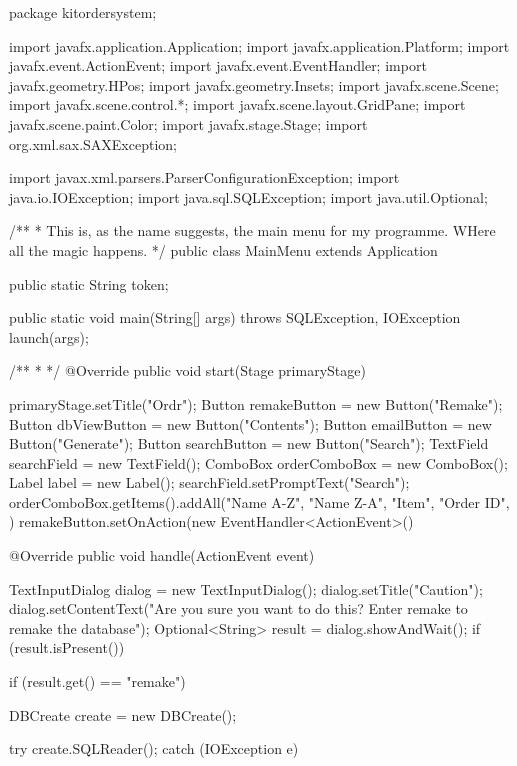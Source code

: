
	\begin{pyglist}[language=java,style=borland,numbers=left,numbersep=5pt]
	package kitordersystem;

import javafx.application.Application;
import javafx.application.Platform;
import javafx.event.ActionEvent;
import javafx.event.EventHandler;
import javafx.geometry.HPos;
import javafx.geometry.Insets;
import javafx.scene.Scene;
import javafx.scene.control.*;
import javafx.scene.layout.GridPane;
import javafx.scene.paint.Color;
import javafx.stage.Stage;
import org.xml.sax.SAXException;

import javax.xml.parsers.ParserConfigurationException;
import java.io.IOException;
import java.sql.SQLException;
import java.util.Optional;

/**
 * This is, as the name suggests, the main menu for my programme. WHere all the magic happens.
 */
public class MainMenu extends Application {

    public static String token;

    public static void main(String[] args) throws SQLException, IOException {
        launch(args);
    }

    /**
     *
     */
    @Override
    public void start(Stage primaryStage) {
        primaryStage.setTitle("Ordr");
        Button remakeButton = new Button("Remake");
        Button dbViewButton = new Button("Contents");
        Button emailButton = new Button("Generate");
        Button searchButton = new Button("Search");
        TextField searchField = new TextField();
        ComboBox orderComboBox = new ComboBox();
        Label label = new Label();
        searchField.setPromptText("Search");
        orderComboBox.getItems().addAll("Name A-Z", "Name Z-A", "Item", "Order ID", )
        remakeButton.setOnAction(new EventHandler<ActionEvent>() {
            @Override
            public void handle(ActionEvent event) {
                TextInputDialog dialog = new TextInputDialog();
                dialog.setTitle("Caution");
                dialog.setContentText("Are you sure you want to do this? Enter remake to remake the database");
                Optional<String> result = dialog.showAndWait();
                if (result.isPresent()) {
                    if (result.get() == "remake") {
                        DBCreate create = new DBCreate();

                        try {
                            create.SQLReader();
                        } catch (IOException e) {

}}}}}}}
\end{pyglist}

